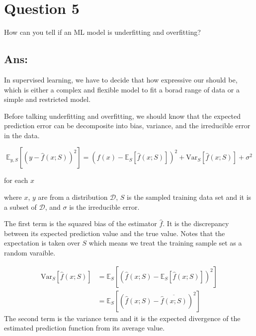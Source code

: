 \documentclass{kthreport}
\begin{document}
\section{Question 5}
How can you tell if an ML model is underfitting and overfitting?
\subsection*{Ans:}

In supervised learning, we have to decide that how expressive our should be,
which is either a complex and flexible model to fit a borad range of data or
a simple and restricted model.

Before talking underfitting and overfitting, we should know that the expected prediction
error can be decomposite into bias, variance, and the irreducible error in the data.

\begin{equation}
    \mathbb{E}_{y,S}[(y-\hat{f}(x; S))^2] =
    (f(x) - \mathbb{E}_{S}[\hat{f}(x; S)])^2
    + \mathrm{Var}_{S}[\hat{f}(x; S)]
    + \sigma^2
\end{equation}

for each $x$

where $x$, $y$ are from a distribution $\mathcal{D}$, $S$ is the sampled training
data set and it is a subset of $\mathcal{D}$, and $\sigma$ is the irreducible error.

The first term is the squared bias of the estimator $\hat{f}$.
It is the discrepancy between its expected prediction value and the true value.
Notes that the expectation is taken over $S$ which means we treat the training sample
set as a random varaible.

\begin{align}
    \mathrm{Var}_{S}[\hat{f}(x; S)]
    &= \mathbb{E}_{S}[(\hat{f}(x; S) - \mathbb{E}_{S}[\hat{f}(x; S)])^2] \\
    &= \mathbb{E}_{S}[(\hat{f}(x; S) - \overline{\hat{f}(x; S)})^2]
\end{align}
The second term is the variance term and it is
the expected divergence of the estimated prediction function from its average value.
\end{document}
